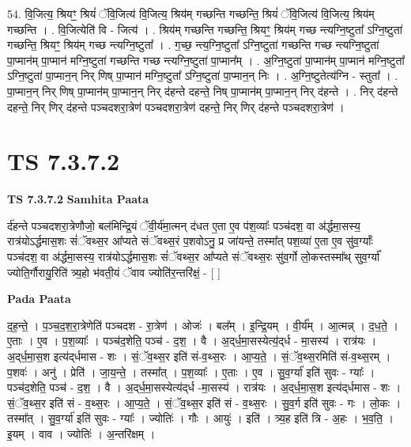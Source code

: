 \documentclass[17pt]{extarticle}
\begin{document}
54. वि॒जित्य॒ श्रियꣳ॒॒ श्रियं॑ ॅवि॒जित्य॑ वि॒जित्य॒ श्रिय॑म् गच्छन्ति गच्छन्ति॒ श्रियं॑ ॅवि॒जित्य॑ वि॒जित्य॒ श्रिय॑म् गच्छन्ति । . वि॒जित्येति॑ वि - जित्य॑ । . श्रिय॑म् गच्छन्ति गच्छन्ति॒ श्रियꣳ॒॒ श्रिय॑म् गच्छ न्त्यग्नि॒ष्टुता᳚ ऽग्नि॒ष्टुता॑ गच्छन्ति॒ श्रियꣳ॒॒ श्रिय॑म् गच्छ न्त्यग्नि॒ष्टुता᳚ । . ग॒च्छ॒ न्त्य॒ग्नि॒ष्टुता᳚ ऽग्नि॒ष्टुता॑ गच्छन्ति गच्छ न्त्यग्नि॒ष्टुता॑ पा॒प्मान॑म् पा॒प्मान॑ मग्नि॒ष्टुता॑ गच्छन्ति गच्छ न्त्यग्नि॒ष्टुता॑ पा॒प्मान᳚म् । . अ॒ग्नि॒ष्टुता॑ पा॒प्मान॑म् पा॒प्मान॑ मग्नि॒ष्टुता᳚ ऽग्नि॒ष्टुता॑ पा॒प्मान॒न् निर् णिष् पा॒प्मान॑ मग्नि॒ष्टुता᳚ ऽग्नि॒ष्टुता॑ पा॒प्मान॒न् निः । . अ॒ग्नि॒ष्टुतेत्य॑ग्नि - स्तुता᳚ । . पा॒प्मान॒न् निर् णिष् पा॒प्मान॑म् पा॒प्मान॒न् निर् द॑हन्ते दहन्ते॒ निष् पा॒प्मान॑म् पा॒प्मान॒न् निर् द॑हन्ते । . निर् द॑हन्ते दहन्ते॒ निर् णिर् द॑हन्ते पञ्चदशरा॒त्रेण॑ पञ्चदशरा॒त्रेण॑ दहन्ते॒ निर् णिर् द॑हन्ते पञ्चदशरा॒त्रेण॑ । \newline
\pagebreak
{}

\section{ TS 7.3.7.2 }

\textbf{TS 7.3.7.2 } \newline
\textbf{Samhita Paata} \newline

र्द॑हन्ते पञ्चदशरा॒त्रेणौजो॒ बल॑मिन्द्रि॒यं ॅवी॒र्य॑मा॒त्मन् द॑धत ए॒ता ए॒व प॑श॒व्याः᳚ पञ्च॑दश॒ वा अ॑र्द्धमा॒सस्य॒ रात्र॑योऽर्द्धमास॒शः सं॑ॅवथ्स॒र आ᳚प्यते संॅवथ्स॒रं प॒शवोऽनु॒ प्र जा॑यन्ते॒ तस्मा᳚त् पश॒व्या॑ ए॒ता ए॒व सु॑व॒र्ग्याः᳚ पञ्च॑दश॒ वा अ॑र्द्धमा॒सस्य॒ रात्र॑योऽर्द्धमास॒शः सं॑ॅवथ्स॒र आ᳚प्यते संॅवथ्स॒रः सु॑व॒र्गो लो॒कस्तस्मा᳚थ् सुव॒र्ग्या᳚ ज्योति॒र्गौरायु॒रिति॑ त्र्य॒हो भ॑वती॒यं ॅवाव ज्योति॑र॒न्तरि॑क्षं॒ - [  ] \newline

\textbf{Pada Paata} \newline

द॒ह॒न्ते॒ । प॒ञ्च॒द॒श॒रा॒त्रेणेति॑ पञ्चदश - रा॒त्रेण॑ । ओजः॑ । बल᳚म् । इ॒न्द्रि॒यम् । वी॒र्य᳚म् । आ॒त्मन्न् । द॒ध॒ते॒ । ए॒ताः । ए॒व । प॒श॒व्याः᳚ । पञ्च॑द॒शेति॒ पञ्च॑ - द॒श॒ । वै । अ॒द्‌र्ध॒मा॒सस्येत्य॒॑द्‌र्ध - मा॒सस्य॑ । रात्र॑यः । अ॒द्‌र्ध॒मा॒स॒श इत्य॑द्‌र्धमास - शः । सं॒ॅव॒थ्स॒र इति॑ सं-व॒थ्स॒रः । आ॒प्य॒ते॒ । सं॒ॅव॒थ्स॒रमिति॑ सं-व॒थ्स॒रम् । प॒शवः॑ । अनु॑ । प्रेति॑ । जा॒य॒न्ते॒ । तस्मा᳚त् । प॒श॒व्याः᳚ । ए॒ताः । ए॒व । सु॒व॒र्ग्या॑ इति॑ सुवः - ग्याः᳚ । पञ्च॑द॒शेति॒ पञ्च॑ - द॒श॒ । वै । अ॒द्‌र्ध॒मा॒सस्येत्य॑द्‌र्ध -मा॒सस्य॑ । रात्र॑यः । अ॒द्‌र्ध॒मा॒स॒श इत्य॑द्‌र्धमास - शः । सं॒ॅव॒थ्स॒र इति॑ सं - व॒थ्स॒रः । आ॒प्य॒ते॒ । सं॒ॅव॒थ्स॒र इति॑ सं - व॒थ्स॒रः । सु॒व॒र्ग इति॑ सुवः - गः । लो॒कः । तस्मा᳚त् । सु॒व॒र्ग्या॑ इति॑ सुवः - ग्याः᳚ । ज्योतिः॑ । गौः । आयुः॑ । इति॑ । त्र्य॒ह इति॑ त्रि - अ॒हः । भ॒व॒ति॒ । इ॒यम् । वाव । ज्योतिः॑ । अ॒न्तरि॑क्षम् ।  \newline
\end{document}
